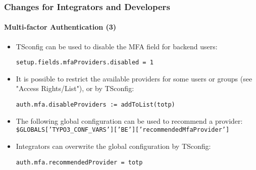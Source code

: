 %

\begin{frame}[fragile]
	\frametitle{Changes for Integrators and Developers}
	\framesubtitle{Multi-factor Authentication (3)}


	\begin{itemize}
		\item TSconfig can be used to disable the MFA field for backend users:
\begin{lstlisting}
setup.fields.mfaProviders.disabled = 1
\end{lstlisting}

		\item It is possible to restrict the available providers for some users
			or groups (see "Access Rights/List"), or by TSconfig:
\begin{lstlisting}
auth.mfa.disableProviders := addToList(totp)
\end{lstlisting}

		\item The following global configuration can be used to recommend a provider:\newline
			\smaller\texttt{\$GLOBALS['TYPO3\_CONF\_VARS']['BE']['recommendedMfaProvider']}\normalsize

		\item Integrators can overwrite the global configuration by TSconfig:
\begin{lstlisting}
auth.mfa.recommendedProvider = totp
\end{lstlisting}

	\end{itemize}

\end{frame}

